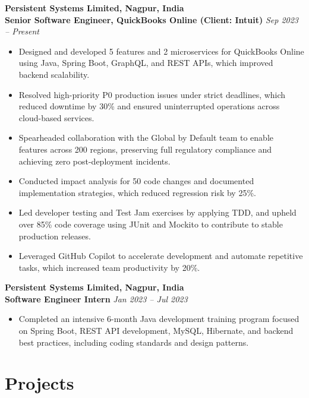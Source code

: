 \documentclass[10pt, letterpaper]{article}
\begin{document}
\textbf{Persistent Systems Limited, Nagpur, India} \\
\textbf{Senior Software Engineer, QuickBooks Online (Client: Intuit)} \hfill \textit{Sep 2023 -- Present}
\begin{itemize}[leftmargin=0.2in, itemsep=1pt, parsep=0pt, topsep=2pt]
    \item Designed and developed 5 features and 2 microservices for QuickBooks Online using Java, Spring Boot, GraphQL, and REST APIs, which improved backend scalability.
    \item Resolved high-priority P0 production issues under strict deadlines, which reduced downtime by 30\% and ensured uninterrupted operations across cloud-based services.
    \item Spearheaded collaboration with the Global by Default team to enable features across 200 regions, preserving full regulatory compliance and achieving zero post-deployment incidents.
    \item Conducted impact analysis for 50 code changes and documented implementation strategies, which reduced regression risk by 25\%.
    \item Led developer testing and Test Jam exercises by applying TDD, and upheld over 85\% code coverage using JUnit and Mockito to contribute to stable production releases.
    \item Leveraged GitHub Copilot to accelerate development and automate repetitive tasks, which increased team productivity by 20\%.
\end{itemize}

\textbf{Persistent Systems Limited, Nagpur, India} \\
\textbf{Software Engineer Intern} \hfill \textit{Jan 2023 -- Jul 2023}
\begin{itemize}[leftmargin=0.2in, itemsep=1pt, parsep=0pt, topsep=2pt]
    \item Completed an intensive 6-month Java development training program focused on Spring Boot, REST API development, MySQL, Hibernate, and backend best practices, including coding standards and design patterns.
\end{itemize}

\section{Projects}
\end{document}

